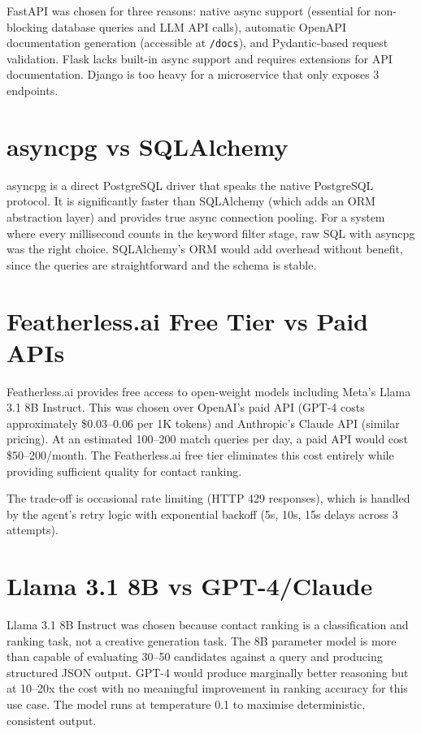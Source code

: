 \documentclass[12pt, a4paper]{report}
\begin{document}
FastAPI was chosen for three reasons: native async support (essential for non-blocking database queries and LLM API calls), automatic OpenAPI documentation generation (accessible at \texttt{/docs}), and Pydantic-based request validation. Flask lacks built-in async support and requires extensions for API documentation. Django is too heavy for a microservice that only exposes 3 endpoints.

\section{asyncpg vs SQLAlchemy}

asyncpg is a direct PostgreSQL driver that speaks the native PostgreSQL protocol. It is significantly faster than SQLAlchemy (which adds an ORM abstraction layer) and provides true async connection pooling. For a system where every millisecond counts in the keyword filter stage, raw SQL with asyncpg was the right choice. SQLAlchemy's ORM would add overhead without benefit, since the queries are straightforward and the schema is stable.

\section{Featherless.ai Free Tier vs Paid APIs}

Featherless.ai provides free access to open-weight models including Meta's Llama 3.1 8B Instruct. This was chosen over OpenAI's paid API (GPT-4 costs approximately \$0.03--0.06 per 1K tokens) and Anthropic's Claude API (similar pricing). At an estimated 100--200 match queries per day, a paid API would cost \$50--200/month. The Featherless.ai free tier eliminates this cost entirely while providing sufficient quality for contact ranking.

The trade-off is occasional rate limiting (HTTP 429 responses), which is handled by the agent's retry logic with exponential backoff (5s, 10s, 15s delays across 3 attempts).

\section{Llama 3.1 8B vs GPT-4/Claude}

Llama 3.1 8B Instruct was chosen because contact ranking is a classification and ranking task, not a creative generation task. The 8B parameter model is more than capable of evaluating 30--50 candidates against a query and producing structured JSON output. GPT-4 would produce marginally better reasoning but at 10--20x the cost with no meaningful improvement in ranking accuracy for this use case. The model runs at temperature 0.1 to maximise deterministic, consistent output.
\end{document}
